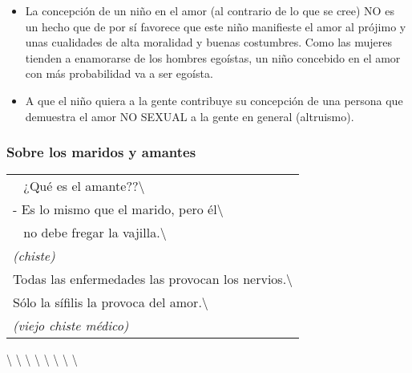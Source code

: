 \begin{itemize}
\tightlist
\item
  La concepción de un niño en el amor (al contrario de lo que se cree)
  NO es un hecho que de por sí favorece que este niño manifieste el amor
  al prójimo y unas cualidades de alta moralidad y buenas costumbres.
  Como las mujeres tienden a enamorarse de los hombres egoístas, un niño
  concebido en el amor con más probabilidad va a ser egoísta.
\item
  A que el niño quiera a la gente contribuye su concepción de una
  persona que demuestra el amor NO SEXUAL a la gente en general
  (altruismo).
\end{itemize}

\protect\hypertarget{M14}{}{}

\subsubsection{Sobre los maridos y
amantes}\label{sobre-los-maridos-y-amantes}

\begin{longtable}[]{@{}l@{}}
\toprule
~ ¿Qué es el amante??\textbackslash{}\tabularnewline
- Es lo mismo que el marido, pero él\textbackslash{}\tabularnewline
~ no debe fregar la vajilla.\textbackslash{}\tabularnewline
\emph{(chiste)}\tabularnewline
Todas las enfermedades las provocan los
nervios.\textbackslash{}\tabularnewline
Sólo la sífilis la provoca del amor.\textbackslash{}\tabularnewline
\emph{(viejo chiste médico)}\tabularnewline
\bottomrule
\end{longtable}

\textbackslash{} \textbackslash{} \textbackslash{} \textbackslash{}
\textbackslash{} \textbackslash{} \textbackslash{} \textbackslash{}


